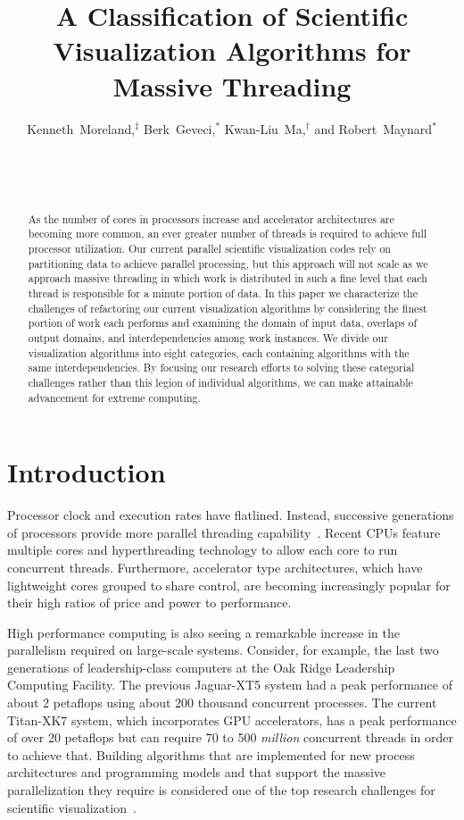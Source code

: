 \documentclass{sig-alternate}
\title{A Classification of Scientific Visualization Algorithms for Massive Threading}
\author{
  \alignauthor
  Kenneth~Moreland,$^{\ddagger}$ Berk~Geveci,$^*$ Kwan-Liu~Ma,$^{\dagger}$
  and Robert~Maynard$^*$\\
  \affaddr{$^{\ddagger}$Sandia National Laboratories}\\
  \affaddr{$^*$Kitware, Inc.}\\
  \affaddr{$^{\dagger}$University of California at Davis}\\
}
\newcommand*{\lcite}[1]{~\cite{#1}}
\begin{document}
\sloppy

\maketitle

\begin{abstract}

As the number of cores in processors increase and accelerator architectures
are becoming more common, an ever greater number of threads is required to
achieve full processor utilization. Our current parallel scientific
visualization codes rely on partitioning data to achieve parallel
processing, but this approach will not scale as we approach massive
threading in which work is distributed in such a fine level that each
thread is responsible for a minute portion of data. In this paper we
characterize the challenges of refactoring our current visualization
algorithms by considering the finest portion of work each performs and
examining the domain of input data, overlaps of output domains, and
interdependencies among work instances. We divide our visualization
algorithms into eight categories, each containing algorithms with the same
interdependencies. By focusing our research efforts to solving these
categorial challenges rather than this legion of individual algorithms, we
can make attainable advancement for extreme computing.

\end{abstract}

\section{Introduction}

\noindent
Processor clock and execution rates have flatlined. Instead, successive
generations of processors provide more parallel threading
capability\lcite{Sutter2005}. Recent CPUs feature multiple cores and
hyperthreading technology to allow each core to run concurrent
threads. Furthermore, accelerator type architectures, which have
lightweight cores grouped to share control, are becoming increasingly
popular for their high ratios of price and power to performance.

High performance computing is also seeing a remarkable increase in the
parallelism required on large-scale systems. Consider, for example, the
last two generations of leadership-class computers at the Oak Ridge
Leadership Computing Facility. The previous Jaguar-XT5 system had a peak
performance of about 2 petaflops using about 200 thousand concurrent
processes. The current Titan-XK7 system, which incorporates GPU
accelerators, has a peak performance of over 20 petaflops but can require
70 to 500 \emph{million} concurrent threads in order to achieve
that. Building algorithms that are implemented for new process
architectures and programming models and that support the massive
parallelization they require is considered one of the top research
challenges for scientific visualization\lcite{Childs2013}.
\end{document}
